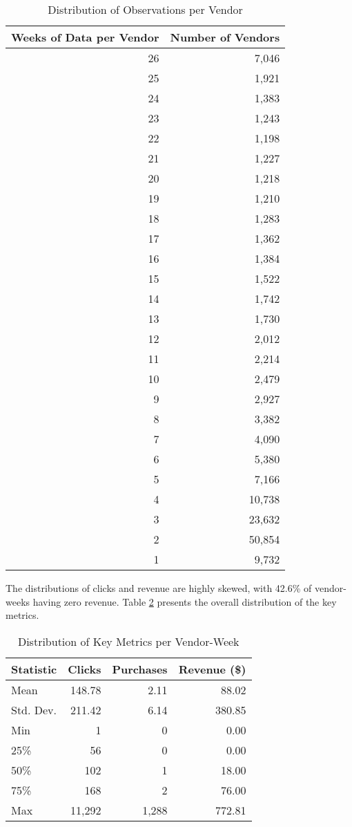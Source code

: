 \begin{table}[htbp!]
\centering
\caption{Distribution of Observations per Vendor}
\label{tab:vendor_obs_dist}
\begin{tabular}{rr}
\toprule
Weeks of Data per Vendor & Number of Vendors \\
\midrule
26 & 7,046 \\
25 & 1,921 \\
24 & 1,383 \\
23 & 1,243 \\
22 & 1,198 \\
21 & 1,227 \\
20 & 1,218 \\
19 & 1,210 \\
18 & 1,283 \\
17 & 1,362 \\
16 & 1,384 \\
15 & 1,522 \\
14 & 1,742 \\
13 & 1,730 \\
12 & 2,012 \\
11 & 2,214 \\
10 & 2,479 \\
9 & 2,927 \\
8 & 3,382 \\
7 & 4,090 \\
6 & 5,380 \\
5 & 7,166 \\
4 & 10,738 \\
3 & 23,632 \\
2 & 50,854 \\
1 & 9,732 \\
\bottomrule
\end{tabular}
\end{table}

The distributions of clicks and revenue are highly skewed, with 42.6\% of vendor-weeks having zero revenue. Table \ref{tab:vendor_dist} presents the overall distribution of the key metrics.

\begin{table}[htbp!]
\centering
\caption{Distribution of Key Metrics per Vendor-Week}
\label{tab:vendor_dist}
\begin{tabular}{lrrr}
\toprule
Statistic & Clicks & Purchases & Revenue (\$) \\
\midrule
Mean & 148.78 & 2.11 & 88.02 \\
Std. Dev. & 211.42 & 6.14 & 380.85 \\
Min & 1 & 0 & 0.00 \\
25\% & 56 & 0 & 0.00 \\
50\% & 102 & 1 & 18.00 \\
75\% & 168 & 2 & 76.00 \\
Max & 11,292 & 1,288 & 772.81 \\
\bottomrule
\end{tabular}
\end{table}

